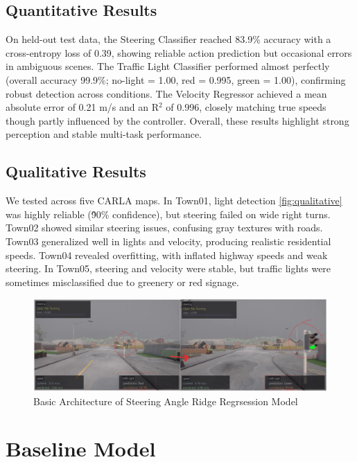 \documentclass{article} %
\begin{document}
\subsection{Quantitative Results}

On held-out test data, the Steering Classifier reached 83.9\% accuracy with a cross-entropy loss of 0.39, showing reliable action prediction but occasional errors in ambiguous scenes. The Traffic Light Classifier performed almost perfectly (overall accuracy 99.9\%; no-light = 1.00, red = 0.995, green = 1.00), confirming robust detection across conditions. The Velocity Regressor achieved a mean absolute error of 0.21 m/s and an R$^2$ of 0.996, closely matching true speeds though partly influenced by the controller. Overall, these results highlight strong perception and stable multi-task performance.

\subsection{Qualitative Results}

We tested across five CARLA maps. In Town01, light detection \autoref{fig:qualitative} was highly reliable (\~90\% confidence), but steering failed on wide right turns. Town02 showed similar steering issues, confusing gray textures with roads. Town03 generalized well in lights and velocity, producing realistic residential speeds. Town04 revealed overfitting, with inflated highway speeds and weak steering. In Town05, steering and velocity were stable, but traffic lights were sometimes misclassified due to greenery or red signage.


\begin{figure}[H] %
    \centering
    \includegraphics[width=1.0\textwidth]{qualittative.png} %
    \caption{Basic Architecture of Steering Angle  Ridge Regrsession Model}
    \label{fig:qualitative}
\end{figure}


\section{Baseline Model}
\end{document}
